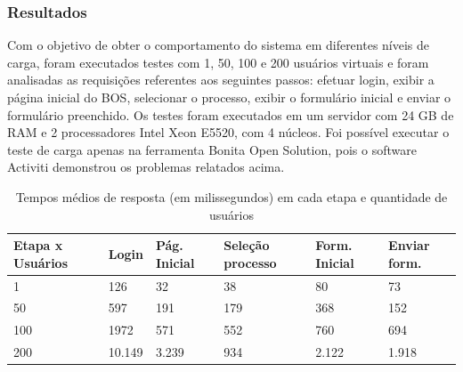 \documentclass[12pt]{article}
\begin{document}


\subsubsection{Resultados}
Com o objetivo de obter o comportamento do sistema em diferentes níveis de carga, foram executados testes com 1, 50, 100 e 200 usuários virtuais e foram analisadas as requisições referentes aos seguintes passos: efetuar login, exibir a página inicial do BOS, selecionar o processo, exibir o formulário inicial e enviar o formulário preenchido. Os testes foram executados em um servidor com 24 GB de RAM e 2 processadores Intel Xeon E5520, com 4 núcleos. Foi possível executar o teste de carga apenas na ferramenta Bonita Open Solution, pois o software Activiti demonstrou os problemas relatados acima.



\begin{table}
{\scriptsize
\centering
\begin{tabular}{|p{2cm}|p{2cm}|p{2cm}|p{2cm}|p{2cm}|p{2cm}|}
 Etapa x Usuários & Login & Pág. Inicial & Seleção processo & Form. Inicial & Enviar form. \\\hline
1 & 126 & 32 & 38 & 80 & 73\\\hline
50 & 597 & 191 & 179 & 368 & 152\\\hline
100 & 1972 & 571 & 552 & 760 & 694\\\hline
200 & 10.149 & 3.239 & 934 & 2.122 & 1.918\\\hline
\end{tabular}
}
\caption{Tempos médios de resposta (em milissegundos) em cada etapa e quantidade de usuários}
\label{tab:resultadoCarga}
\end{table}
\end{document}
